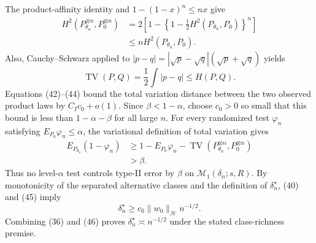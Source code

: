 The product-affinity identity and \(1-(1-x)^n\leq nx\) give
\[
 \begin{aligned}
 H^2(P_{\theta_n}^{\otimes n},P_0^{\otimes n})
 &=2\left[1-\left\{1-\frac12H^2(P_{\theta_n},P_0)\right\}^{n}\right]\\
 &\leq nH^2(P_{\theta_n},P_0).
 \end{aligned}
 \tag{43}
\]
Also, Cauchy--Schwarz applied to
\(
 |p-q|=|\sqrt p-\sqrt q|(\sqrt p+\sqrt q)
\) yields
\[
 \operatorname{TV}(P,Q)=\frac12\int|p-q|\leq H(P,Q).
 \tag{44}
\]
Equations (42)--(44) bound the total variation distance between the two observed product laws by \(C_Ic_0+o(1)\).  Since \(\beta<1-\alpha\), choose \(c_0>0\) so small that this bound is less than \(1-\alpha-\beta\) for all large \(n\).  For every randomized test \(\varphi_n\) satisfying \(E_{P_0}\varphi_n\leq\alpha\), the variational definition of total variation gives
\[
 \begin{aligned}
 E_{P_{\theta_n}}(1-\varphi_n)
 &\geq1-E_{P_0}\varphi_n
  -\operatorname{TV}(P_{\theta_n}^{\otimes n},P_0^{\otimes n})\\
 &>\beta.
 \end{aligned}
 \tag{45}
\]
Thus no level-\(\alpha\) test controls type-II error by \(\beta\) on \(\mathcal M_1(\delta_n;s,R)\).  By monotonicity of the separated alternative classes and the definition of \(\delta_n^\star\), (40) and (45) imply
\[
 \delta_n^\star\geq c_0\|w_0\|_{\mathcal H}n^{-1/2}.
 \tag{46}
\]
Combining (36) and (46) proves \(\delta_n^\star\asymp n^{-1/2}\) under the stated class-richness premise.
